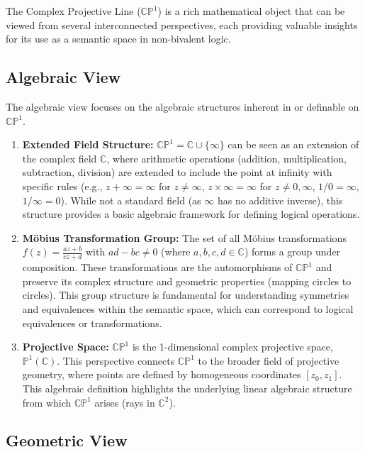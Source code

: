 	The Complex Projective Line ($\mathbb{CP}^1$) is a rich mathematical object that can be viewed from several interconnected perspectives, each providing valuable insights for its use as a semantic space in non-bivalent logic.
	
	\subsection{Algebraic View}
	
	The algebraic view focuses on the algebraic structures inherent in or definable on $\mathbb{CP}^1$.
	
	\begin{enumerate}
		\item \textbf{Extended Field Structure:} $\mathbb{CP}^1 = \mathbb{C} \cup \{\infty\}$ can be seen as an extension of the complex field $\mathbb{C}$, where arithmetic operations (addition, multiplication, subtraction, division) are extended to include the point at infinity with specific rules (e.g., $z + \infty = \infty$ for $z \neq \infty$, $z \times \infty = \infty$ for $z \neq 0, \infty$, $1/0 = \infty$, $1/\infty = 0$). While not a standard field (as $\infty$ has no additive inverse), this structure provides a basic algebraic framework for defining logical operations.
		
		\item \textbf{M\"{o}bius Transformation Group:} The set of all M\"{o}bius transformations $f(z) = \frac{az+b}{cz+d}$ with $ad-bc \neq 0$ (where $a, b, c, d \in \mathbb{C}$) forms a group under composition. These transformations are the automorphisms of $\mathbb{CP}^1$ and preserve its complex structure and geometric properties (mapping circles to circles). This group structure is fundamental for understanding symmetries and equivalences within the semantic space, which can correspond to logical equivalences or transformations.
		
		\item \textbf{Projective Space:} $\mathbb{CP}^1$ is the 1-dimensional complex projective space, $\mathbb{P}^1(\mathbb{C})$. This perspective connects $\mathbb{CP}^1$ to the broader field of projective geometry, where points are defined by homogeneous coordinates $[z_0, z_1]$. This algebraic definition highlights the underlying linear algebraic structure from which $\mathbb{CP}^1$ arises (rays in $\mathbb{C}^2$).
	\end{enumerate}
	
	\subsection{Geometric View}
	
